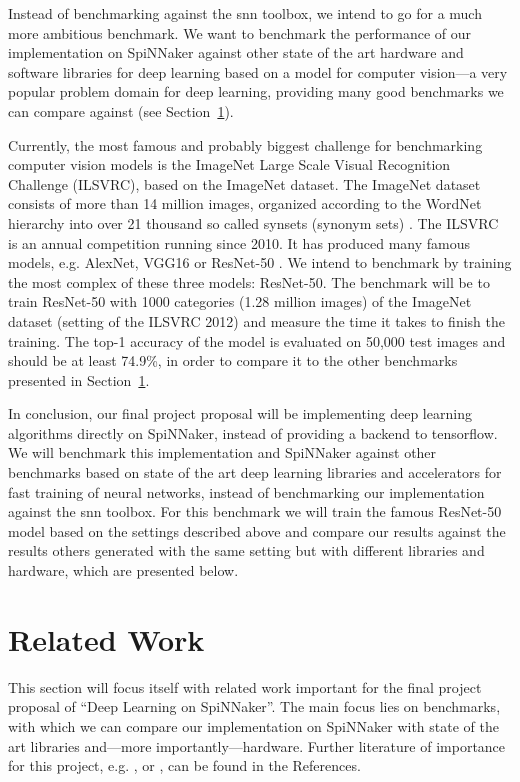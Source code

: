 \documentclass{article}
\begin{document}
Instead of benchmarking against the snn toolbox, we intend
to go for a much more ambitious benchmark.
We want to benchmark the performance of our implementation
on SpiNNaker against other state of the art hardware and
software libraries for deep learning based on a model for
computer vision---a very popular problem domain for deep
learning, providing many good benchmarks we can compare
against (see Section~\ref{sec:related_work}).

Currently, the most famous and probably biggest challenge
for benchmarking computer vision models is the
ImageNet Large Scale Visual Recognition Challenge (ILSVRC),
based on the ImageNet dataset.
The ImageNet dataset consists of more than 14 million
images, organized according to the WordNet hierarchy into
over 21 thousand so called synsets (synonym sets)
\citep{imagenet, wordnet}.
The ILSVRC is an annual competition running since 2010.
It has produced many famous models, e.g. AlexNet, VGG16 or
ResNet-50 \citep{alexnet, simonyan_et_al_2014,
  he_et_al_2015}.
We intend to benchmark by training the most complex of
these three models: ResNet-50.
The benchmark will be to train ResNet-50 with 1000
categories (1.28 million images) of the ImageNet dataset
(setting of the ILSVRC 2012) and measure the time it takes
to finish the training.
The top-1 accuracy of the model is evaluated on 50,000 test
images and should be at least 74.9\%, in order to compare
it to the other benchmarks presented in
Section~\ref{sec:related_work}.

In conclusion, our final project proposal will be
implementing deep learning algorithms directly on
SpiNNaker, instead of providing a backend to tensorflow.
We will benchmark this implementation and SpiNNaker against
other benchmarks based on state of the art deep learning
libraries and accelerators for fast training of neural
networks, instead of benchmarking our implementation
against the snn toolbox.
For this benchmark we will train the famous ResNet-50 model
based on the settings described above and compare our
results against the results others generated with the same
setting but with different libraries and hardware, which
are presented below.


\section{Related Work} %
\label{sec:related_work}

This section will focus itself with related work important
for the final project proposal of ``Deep Learning on
SpiNNaker''.
The main focus lies on benchmarks, with which we can
compare our implementation on SpiNNaker with state of the
art libraries and---more importantly---hardware.
Further literature of importance for this project, e.g.
\citet{he_et_al_2015}, \citet{goodfellow2016} or
\citet{imagenet}, can be found in the References.
\end{document}
